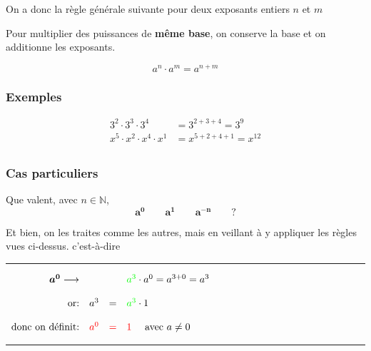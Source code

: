 \documentclass[
  12pt,
]{book}
\begin{document}
On a donc la règle générale suivante pour deux exposants entiers \(n\) et \(m\)

\begin{reglebox}
Pour multiplier des puissances de \textbf{même base}, on conserve la base et on additionne les exposants.

\[a^n\cdot a^m = a^{n+m}\]

\end{reglebox}

\hypertarget{exemples-2}{%
\subsubsection{Exemples}\label{exemples-2}}

\begin{align*}
 3^2\cdot 3^3 \cdot 3^4 & = 3^{2+3+4}= 3^9\\
 x^5\cdot x^2 \cdot x^4 \cdot x^1 & = x^{5+2+4+1}= x^{12}\\
\end{align*}

\hypertarget{cas-particuliers}{%
\subsubsection{Cas particuliers}\label{cas-particuliers}}

Que valent, avec \(n\in\mathbb{N}\),
\[\boldsymbol{a^0\qquad a^1\qquad a^{-n}}\qquad ?\]

Et bien, on les traites comme les autres, mais en veillant à y appliquer les règles vues ci-dessus. c'est-à-dire

\begin{center}\rule{0.5\linewidth}{0.5pt}\end{center}

\(\begin{array}{rrcl}  \boldsymbol{a^0}\longrightarrow & & &{\color{green}a^3}\cdot a^0 = a^{3+0} = a^3\\  &&&\\  \text{or:}& a^3 & = &{\color{green}a^3}\cdot 1\\  &&&\\  \text{donc on définit:}&{\color{red}a^0} & {\color{red}=}& {\color{red}1}\quad\text{ avec } a\neq 0\\  \end{array}\)

\begin{center}\rule{0.5\linewidth}{0.5pt}\end{center}
\end{document}
